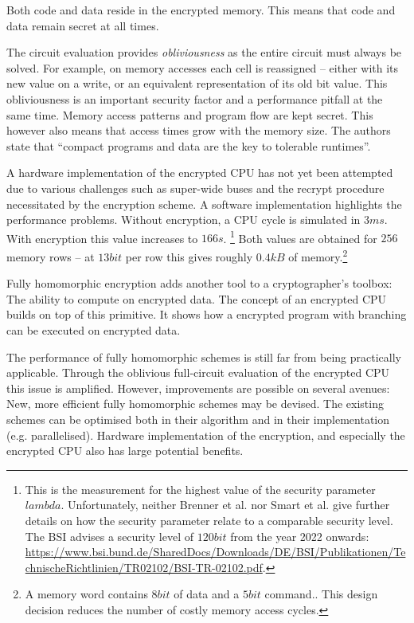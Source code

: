 \begin{description}
Both code and data reside in the encrypted memory. This means that code and data remain secret at all times.\label{ID_1323926141}

The circuit evaluation provides \textit{obliviousness} as the entire circuit must always be solved. For example, on memory accesses each cell is reassigned -- either with its new value on a write, or an equivalent representation of its old bit value.\label{ID_818872921}
This obliviousness is an important security factor and a performance pitfall at the same time. Memory access patterns and program flow are kept secret. This however also means that access times grow with the memory size. The authors state that ``compact programs and data are the key to tolerable runtimes''.\cite[]{Brenner2012}\label{ID_1325928179}

A hardware implementation of the encrypted CPU has not yet been attempted due to various challenges such as super-wide buses and the recrypt procedure necessitated by the encryption scheme.\label{ID_1008727172}
A software implementation highlights the performance problems. Without encryption, a CPU cycle is simulated in $3 ms$. With encryption this value increases to $166 s$.\label{ID_1078829631}
\footnote{This is the measurement for the highest value of the security parameter $lambda$. Unfortunately, neither Brenner et al. nor Smart et al.\cite{Smart2010} give further details on how the security parameter relate to a comparable security level. The BSI advises a security level of $120 bit$ from the year 2022 onwards: \url{https://www.bsi.bund.de/SharedDocs/Downloads/DE/BSI/Publikationen/TechnischeRichtlinien/TR02102/BSI-TR-02102.pdf}.}\label{ID_1789113343}
Both values are obtained for $256$ memory rows -- at $13 bit$ per row this gives roughly $0.4 kB$ of memory.\footnote{A memory word contains $8 bit$ of data and a $5 bit$ command.\cite{Brenner2011}. This design decision reduces the number of costly memory access cycles.}\cite[]{Brenner2012}\label{ID_1799557031}
\end{description}\label{ID_408605672}

Fully homomorphic encryption adds another tool to a cryptographer's toolbox: The ability to compute on encrypted data. The concept of an encrypted CPU builds on top of this primitive. It shows how a encrypted program with branching can be executed on encrypted data.\label{ID_1875507588}

The performance of fully homomorphic schemes is still far from being practically applicable. Through the oblivious full-circuit evaluation of the encrypted CPU this issue is amplified. However, improvements are possible on several avenues:\label{ID_607327069}
New, more efficient fully homomorphic schemes may be devised. The existing schemes can be optimised both in their algorithm and in their implementation (e.g. parallelised). Hardware implementation of the encryption, and especially the encrypted CPU also has large potential benefits.\label{ID_262947221}

